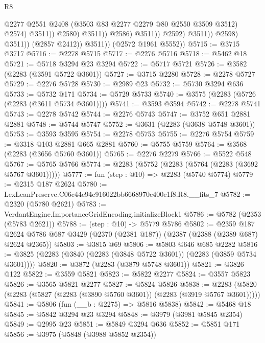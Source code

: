 \begin{lexlean}{R8}
\begin{coremodule}
                                          @2277
                                          @2551
                                          @2408
                                          (@3503 @83 @2277 @2279 @80 @2550 @3509 @3512)
                                          @2574)
                                        @3511))
                                    @2580)
                                  @3511))
                              @2586)
                            @3511))
                        @2592)
                      @3511))
                  @2598)
                @3511))
            (@2857 @2412))
          @3511))
      (@2572 @1961 @5552))
@5715 := @3715 @3717
@5716 := @2278 @5715
@5717 := @2276 @5716
@5718 := @5462 @18
@5721 := @5718 @3294 @23 @3294
@5722 := @5717 @5721
@5726 := @3582 (@2283 (@3591 @5722 @3601))
@5727 := @3715 @2280
@5728 := @2278 @5727
@5729 := @2276 @5728
@5730 := @2989 @23
@5732 := @5730 @3294 @636
@5733 := @5732 @171
@5734 := @5729 @5733
@5740 := @3575 (@2283 (@5726 (@2283 (@3611 @5734 @3601))))
@5741 := @3593 @3594
@5742 := @2278 @5741
@5743 := @2278 @5742
@5744 := @2276 @5743
@5747 := @3752 @651 @2881 @2881
@5748 := @5744 @5747
@5752 := @3631 (@2283 (@3638 @5748 @3601))
@5753 := @3593 @3595
@5754 := @2278 @5753
@5755 := @2276 @5754
@5759 := @3318 @103 @2881 @665 @2881
@5760 := @5755 @5759
@5764 := @3568 (@2283 (@3656 @5760 @3601))
@5765 := @2276 @2279
@5766 := @5522 @548
@5767 := @5765 @5766
@5774 := @2283 (@5752 (@2283 (@5764 (@2283 (@3692 @5767 @3601)))))
@5777 := fun (step : @10) => @2283 (@5740 @5774)
@5779 := @2315 @187 @2624
@5780 := LexLeanPreserve.C06c44e94c916022bb6668970c400c1f8.R8.__fits_7
@5782 := @2320 (@5780 @2621)
@5783 := VerdantEngine.ImportanceGridEncoding.initializeBlock1
@5786 := @5782 (@2353 (@5783 @2621))
@5788 := (step : @10) -> @5779 @5786
@5802 := @2359
    @187
    @2624
    @5786
    @687
    @3429
    (@2370 (@2381 @187))
    (@2387 (@2388 (@2389 @687) @2624 @2365))
@5803 := @3815 @69
@5806 := @5803 @646 @685 @2282
@5816 := @3825 (@2283 (@3840 (@2283 (@3848 @5722 @3601)) (@2283 (@3859 @5734 @3601))))
@5820 := @3872 (@2283 (@3879 @5748 @3601))
@5821 := @3826 @122
@5822 := @3559 @5821
@5823 := @5822 @2277
@5824 := @3557 @5823
@5826 := @3565 @5821 @2277
@5827 := @5824 @5826
@5838 := @2283 (@5820 (@2283 (@5827 (@2283 (@3890 @5760 @3601)) (@2283 (@3919 @5767 @3601)))))
@5841 := @5806 (fun (__b : @2275) => @5816 @5838)
@5842 := @5468 @18
@5845 := @5842 @3294 @23 @3294
@5848 := @3979 (@3981 @5845 @2354)
@5849 := @2995 @23
@5851 := @5849 @3294 @636
@5852 := @5851 @171
@5856 := @3975 (@5848 (@3988 @5852 @2354))

\end{coremodule}
\end{lexlean}
